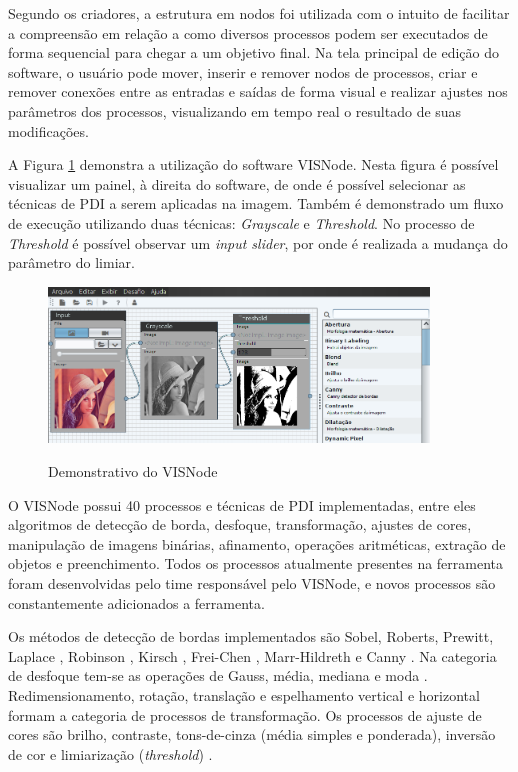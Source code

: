 \documentclass[
	12pt,				%
	oneside,			%
	a4paper,			%
	english,			%
	french,				%
	spanish,			%
	brazil,				%
	]{abntex2}
\newcommand{\vnNumeroTotalProcessos}{40}
\begin{document}
Segundo os criadores, a estrutura em nodos foi utilizada com o intuito de facilitar a compreensão em relação a como diversos processos podem ser executados de forma sequencial para chegar a um objetivo final. Na tela principal de edição do software, o usuário pode mover, inserir e remover nodos de processos, criar e remover conexões entre as entradas e saídas de forma visual e realizar ajustes nos parâmetros dos processos, visualizando em tempo real o resultado de suas modificações.

A Figura \ref{fig:visnode} demonstra a utilização do software VISNode. Nesta figura é possível visualizar um painel, à direita do software, de onde é possível selecionar as técnicas de PDI a serem aplicadas na imagem. Também é demonstrado um fluxo de execução utilizando duas técnicas: \textit{Grayscale} e \textit{Threshold}. No processo de \textit{Threshold} é possível observar um \textit{input slider}, por onde é realizada a mudança do parâmetro do limiar.

\begin{figure}[ht]
\centering
\caption{Demonstrativo do VISNode}
\includegraphics[width=0.9\textwidth]{imagens/visnode.png}
\sourceAuthor
\label{fig:visnode}
\end{figure}

O VISNode possui \vnNumeroTotalProcessos{} processos e técnicas de PDI implementadas, entre eles algoritmos de detecção de borda, desfoque, transformação, ajustes de cores, manipulação de imagens binárias, afinamento, operações aritméticas, extração de objetos e preenchimento. Todos os processos atualmente presentes na ferramenta foram desenvolvidas pelo time responsável pelo VISNode, e novos processos são constantemente adicionados a ferramenta.

Os métodos de detecção de bordas implementados são Sobel, Roberts, Prewitt, Laplace \cite{gonzalesWoods:2008}, Robinson \cite{robinson1977edge}, Kirsch \cite{kirsch1971computer}, Frei-Chen \cite{chen1977fast}, Marr-Hildreth \cite{marr1980theory} e Canny \cite{canny:1986}. Na categoria de desfoque tem-se as operações de Gauss, média, mediana e moda \cite{gonzalesWoods:2008}. Redimensionamento, rotação, translação e espelhamento vertical e horizontal \cite{gonzalesWoods:2008} formam a categoria de processos de transformação. Os processos de ajuste de cores são brilho, contraste, tons-de-cinza (média simples e ponderada), inversão de cor e limiarização (\textit{threshold})  \cite{gonzalesWoods:2008}. 
\end{document}
